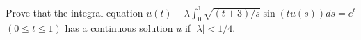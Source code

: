 Prove that the integral equation $u(t)-\lambda\int_0^1
\sqrt{(t+3)/s}\sin(t u(s))ds=e^t$ $(0\leq t\leq 1)$ has a continuous
solution $u$ if $|\lambda|<1/4$.
